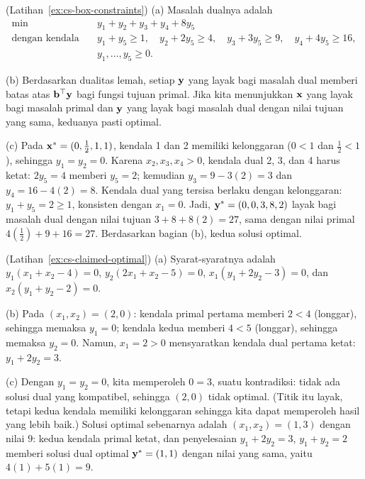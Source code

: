 \begin{solution}(Latihan~\ref{ex:cs-box-constraints})
(a) Masalah dualnya adalah
\[
\begin{aligned}
\min \quad & y_1 + y_2 + y_3 + y_4 + 8y_5 \\
\text{dengan kendala} \quad & y_1 + y_5 \geq 1, \quad y_2 + 2y_5 \geq 4, \quad y_3 + 3y_5 \geq 9, \quad y_4 + 4y_5 \geq 16, \\
& y_1, \dots, y_5 \geq 0.
\end{aligned}
\]

(b) Berdasarkan dualitas lemah, setiap $\mathbf{y}$ yang layak bagi masalah dual memberi batas atas $\mathbf{b}^\top \mathbf{y}$ bagi fungsi tujuan primal. Jika kita menunjukkan $\mathbf{x}$ yang layak bagi masalah primal dan $\mathbf{y}$ yang layak bagi masalah dual dengan nilai tujuan yang sama, keduanya pasti optimal.

(c) Pada $\mathbf{x}^* = (0, \tfrac{1}{2}, 1, 1)$, kendala 1 dan 2 memiliki kelonggaran ($0 < 1$ dan $\tfrac12 < 1$), sehingga $y_1 = y_2 = 0$. Karena $x_2, x_3, x_4 > 0$, kendala dual 2, 3, dan 4 harus ketat: $2y_5 = 4$ memberi $y_5 = 2$; kemudian $y_3 = 9 - 3(2) = 3$ dan $y_4 = 16 - 4(2) = 8$. Kendala dual yang tersisa berlaku dengan kelonggaran: $y_1 + y_5 = 2 \geq 1$, konsisten dengan $x_1 = 0$. Jadi, $\mathbf{y}^* = (0, 0, 3, 8, 2)$ layak bagi masalah dual dengan nilai tujuan $3 + 8 + 8(2) = 27$, sama dengan nilai primal $4(\tfrac12) + 9 + 16 = 27$. Berdasarkan bagian (b), kedua solusi optimal.
\end{solution}

\begin{solution}(Latihan~\ref{ex:cs-claimed-optimal})
(a) Syarat-syaratnya adalah $y_1(x_1 + x_2 - 4) = 0$, $y_2(2x_1 + x_2 - 5) = 0$, $x_1(y_1 + 2y_2 - 3) = 0$, dan $x_2(y_1 + y_2 - 2) = 0$.

(b) Pada $(x_1, x_2) = (2, 0)$: kendala primal pertama memberi $2 < 4$ (longgar), sehingga memaksa $y_1 = 0$; kendala kedua memberi $4 < 5$ (longgar), sehingga memaksa $y_2 = 0$. Namun, $x_1 = 2 > 0$ mensyaratkan kendala dual pertama ketat: $y_1 + 2y_2 = 3$.

(c) Dengan $y_1 = y_2 = 0$, kita memperoleh $0 = 3$, suatu kontradiksi: tidak ada solusi dual yang kompatibel, sehingga $(2,0)$ tidak optimal. (Titik itu layak, tetapi kedua kendala memiliki kelonggaran sehingga kita dapat memperoleh hasil yang lebih baik.) Solusi optimal sebenarnya adalah $(x_1, x_2) = (1, 3)$ dengan nilai $9$: kedua kendala primal ketat, dan penyelesaian $y_1 + 2y_2 = 3$, $y_1 + y_2 = 2$ memberi solusi dual optimal $\mathbf{y}^* = (1,1)$ dengan nilai yang sama, yaitu $4(1) + 5(1) = 9$.
\end{solution}

